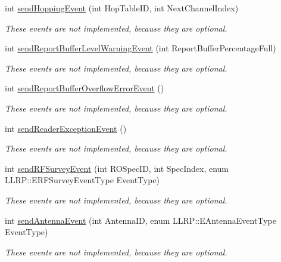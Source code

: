 {\bf }\par
\begin{DoxyCompactItemize}
\item 
int \hyperlink{class_e_l_f_i_n_1_1_event_notifier_a03d74a6b19765174ad05013f8f0e51d4}{send\-Hopping\-Event} (int Hop\-Table\-I\-D, int Next\-Channel\-Index)
\begin{DoxyCompactList}\small\item\em These events are not implemented, because they are optional. \end{DoxyCompactList}\item 
int \hyperlink{class_e_l_f_i_n_1_1_event_notifier_ab1aa4c5e86335d17c6e091b49d8979a8}{send\-Report\-Buffer\-Level\-Warning\-Event} (int Report\-Buffer\-Percentage\-Full)
\begin{DoxyCompactList}\small\item\em These events are not implemented, because they are optional. \end{DoxyCompactList}\item 
int \hyperlink{class_e_l_f_i_n_1_1_event_notifier_af1beb53b55e0ef06fc5711d86abe7e61}{send\-Report\-Buffer\-Overflow\-Error\-Event} ()
\begin{DoxyCompactList}\small\item\em These events are not implemented, because they are optional. \end{DoxyCompactList}\item 
int \hyperlink{class_e_l_f_i_n_1_1_event_notifier_a756c170fc8e5de0e1ae1c53e69efa833}{send\-Reader\-Exception\-Event} ()
\begin{DoxyCompactList}\small\item\em These events are not implemented, because they are optional. \end{DoxyCompactList}\item 
int \hyperlink{class_e_l_f_i_n_1_1_event_notifier_a7a618ade6fbf12cb93ec11fef5b396cd}{send\-R\-F\-Survey\-Event} (int R\-O\-Spec\-I\-D, int Spec\-Index, enum L\-L\-R\-P\-::\-E\-R\-F\-Survey\-Event\-Type Event\-Type)
\begin{DoxyCompactList}\small\item\em These events are not implemented, because they are optional. \end{DoxyCompactList}\item 
int \hyperlink{class_e_l_f_i_n_1_1_event_notifier_a5f5c26ba9f40ea6cc9b0f166bdfaca8d}{send\-Antenna\-Event} (int Antenna\-I\-D, enum L\-L\-R\-P\-::\-E\-Antenna\-Event\-Type Event\-Type)
\begin{DoxyCompactList}\small\item\em These events are not implemented, because they are optional. \end{DoxyCompactList}\end{DoxyCompactItemize}

